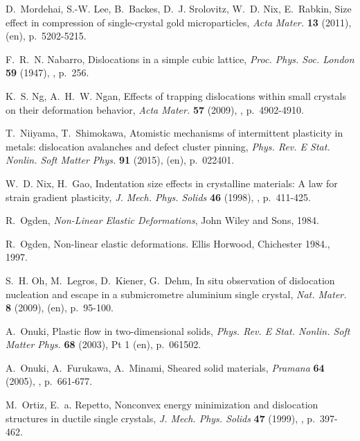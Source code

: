 \documentclass[CRPHYS,Unicode,manuscript]{cedram}
\begin{document}
\begin{thebibliography}{100}
D.~Mordehai, S.-W. Lee, B.~Backes, D.~J. Srolovitz, W.~D. Nix, E.~Rabkin, {\og
  Size effect in compression of single-crystal gold microparticles\fg},
  \emph{Acta Mater.} \textbf{13} (2011),  (en), p.~5202-5215.

F.~R.~N. Nabarro, {\og Dislocations in a simple cubic lattice\fg}, \emph{Proc.
  Phys. Soc. London} \textbf{59} (1947), , p.~256.

K.~S. Ng, A.~H.~W. Ngan, {\og Effects of trapping dislocations within small
  crystals on their deformation behavior\fg}, \emph{Acta Mater.} \textbf{57}
  (2009), , p.~4902-4910.

T.~Niiyama, T.~Shimokawa, {\og Atomistic mechanisms of intermittent plasticity
  in metals: dislocation avalanches and defect cluster pinning\fg}, \emph{Phys.
  Rev. E Stat. Nonlin. Soft Matter Phys.} \textbf{91} (2015), 
  (en), p.~022401.

W.~D. Nix, H.~Gao, {\og Indentation size effects in crystalline materials: A
  law for strain gradient plasticity\fg}, \emph{J. Mech. Phys. Solids}
  \textbf{46} (1998), , p.~411-425.

R.~Ogden, \emph{Non-Linear Elastic Deformations}, John Wiley and Sons, 1984.

R.~Ogden, {\og Non-linear elastic deformations. Ellis Horwood, Chichester
  1984.\fg}, 1997.

S.~H. Oh, M.~Legros, D.~Kiener, G.~Dehm, {\og In situ observation of
  dislocation nucleation and escape in a submicrometre aluminium single
  crystal\fg}, \emph{Nat. Mater.} \textbf{8} (2009),  (en),
  p.~95-100.

A.~Onuki, {\og Plastic flow in two-dimensional solids\fg}, \emph{Phys. Rev. E
  Stat. Nonlin. Soft Matter Phys.} \textbf{68} (2003),  Pt 1 (en),
  p.~061502.

A.~Onuki, A.~Furukawa, A.~Minami, {\og Sheared solid materials\fg},
  \emph{Pramana} \textbf{64} (2005), , p.~661-677.

M.~Ortiz, E.~a. Repetto, {\og Nonconvex energy minimization and dislocation
  structures in ductile single crystals\fg}, \emph{J. Mech. Phys. Solids}
  \textbf{47} (1999), , p.~397-462.


\end{thebibliography}
\end{document}
